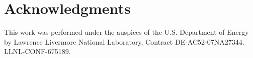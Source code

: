 \section*{Acknowledgments}

This work was performed under the auspices of the U.S. Department of
Energy by Lawrence Livermore National Laboratory, Contract
DE-AC52-07NA27344.  LLNL-CONF-675189.
